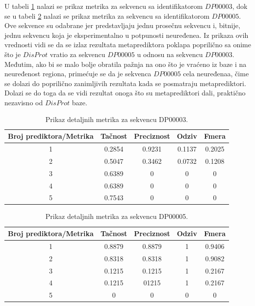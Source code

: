 U tabeli \ref{table:2} nalazi se prikaz metrika za sekvencu sa identifikatorom $DP00003$, dok se u tabeli \ref{table:3} nalazi se prikaz metrika za sekvencu sa identifikatorom $DP00005$. Ove sekvence su odabrane jer predstavljaju jednu prosečnu sekvencu i, bitnije, jednu sekvencu koja je eksperimentalno u potpunosti neuređenea. Iz prikaza ovih vrednosti vidi se da se izlaz rezultata metaprediktora poklapa  poprilično sa onime što je $DisProt$ vratio za sekvencu $DP00005$ u odnosu na sekvencu $DP00003$. Međutim, ako bi se malo bolje obratila pažnja na ono što je vraćeno iz baze i na neuređenost regiona, primećuje se da je sekvenca $DP00005$ cela neuređenaa, čime se dolazi do poprilično zanimljivih rezultata kada se posmatraju metaprediktori. Dolazi se do toga da se vidi rezultat onoga što su metaprediktori dali, praktično nezavisno od $DisProt$ baze. 

\begin{table}[H]
\centering
 \begin{tabular}{||c c c c c||} 
 \hline
 Broj prediktora/Metrika & Tačnost & Preciznost & Odziv & Fmera\\ [0.5ex] 
 \hline\hline
 1 & 0.2854 & 0.9231 & 0.1137 & 0.2025 \\ 
 \hline
 2 & 0.5047 & 0.3462 & 0.0732 & 0.1208 \\
 \hline
 3 & 0.6389 & 0 & 0 & 0 \\
 \hline
 4 & 0.6389 & 0 & 0 & 0\\
 \hline
 5 & 0.7543 & 0 & 0 & 0\\ [1ex] 
 \hline
\end{tabular}
\caption{Prikaz detaljnih metrika za sekvencu DP00003.}
\label{table:2}
\end{table}

\begin{table}[H]
\centering
 \begin{tabular}{||c c c c c||} 
 \hline
 Broj prediktora/Metrika & Tačnost & Preciznost & Odziv & Fmera\\ [0.5ex] 
 \hline\hline
 1 & 0.8879 & 0.8879 & 1 & 0.9406 \\ 
 \hline
 2 & 0.8318 & 0.8318 & 1 & 0.9082 \\
 \hline
 3 & 0.1215 & 0.1215 & 1 & 0.2167 \\
 \hline
 4 & 0.1215 & 01215 & 1 & 0.2167\\
 \hline
 5 & 0 & 0 & 0 & 0\\ [1ex] 
 \hline
\end{tabular}
\caption{Prikaz detaljnih metrika za sekvencu DP00005.}
\label{table:3}
\end{table}

